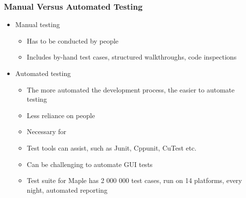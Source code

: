 \documentclass[t,12pt,numbers,fleqn]{beamer}
\begin{document}

\begin{frame}
\frametitle{Manual Versus Automated Testing}
\begin{itemize}
\item Manual testing
\begin{itemize}
\item Has to be conducted by people
\item Includes by-hand test cases, structured walkthroughs, code inspections
\end{itemize}
\item Automated testing
\begin{itemize}
\item The more automated the development process, the easier to automate testing
\item Less reliance on people
\item Necessary for 
\item Test tools can assist, such as Junit, Cppunit, CuTest etc.
\item Can be challenging to automate GUI tests
\item Test suite for Maple has 2 000 000 test cases, run on 14 platforms, every
  night, automated reporting
\end{itemize}
\end{itemize}
\end{frame}


\end{document}
